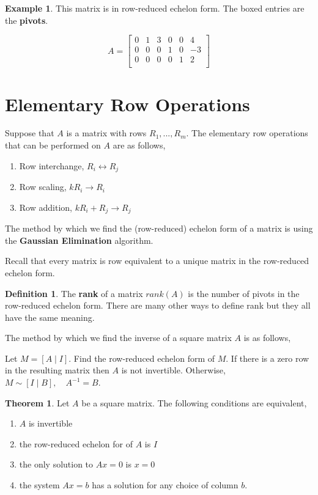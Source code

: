 \documentclass{report}
\theoremstyle{definition}
\newtheorem*{_def}{Definition}
\newtheorem{_thm}{Theorem}[section]
\newtheorem{ex}{Example}[section]
\theoremstyle{remark}
\begin{document}
\begin{ex}
This matrix is in row-reduced echelon form.
The boxed entries are the \textbf{pivots}.

\[A=
\begin{bmatrix}
 0 & \boxed{1} & 3 & 0 & 0 & 4 \\
 0 & 0 & 0 & \boxed{1} & 0 & -3 \\
 0 & 0 & 0 & 0 & \boxed{1} & 2 \\
\end{bmatrix}
\]
\end{ex}

\section{Elementary Row Operations}

Suppose that $A$ is a matrix with rows $R_1,...,R_m$.
The elementary row operations that can be performed on $A$ are as follows,

\begin{enumerate}
 \item Row interchange, $R_i\leftrightarrow R_j$
 \item Row scaling, $kR_i\rightarrow R_i$
 \item Row addition, $kR_i+R_j\rightarrow R_j$
\end{enumerate}

The method by which we find the (row-reduced) echelon form of a matrix is using the \textbf{Gaussian Elimination} algorithm. \newline

Recall that every matrix is row equivalent to a unique matrix in the row-reduced echelon form.

\begin{_def}
The \textbf{rank} of a matrix $rank(A)$ is the number of pivots in the row-reduced echelon form.
There are many other ways to define rank but they all have the same meaning.
\end{_def}

The method by which we find the inverse of a square matrix $A$ is as follows,

Let $M=[A\mid I]$. 
Find the row-reduced echelon form of $M$.
If there is a zero row in the resulting matrix then $A$ is not invertible.
Otherwise, $M\sim [I\mid B], \quad A^{-1}=B$.

\begin{_thm}
Let $A$ be a square matrix.
The following conditions are equivalent,
\begin{enumerate}
 \item $A$ is invertible
 \item the row-reduced echelon for of $A$ is $I$
 \item the only solution to $Ax=0$ is $x=0$
 \item the system $Ax=b$ has a solution for any choice of column $b$.
\end{enumerate}
\end{_thm}
\end{document}
